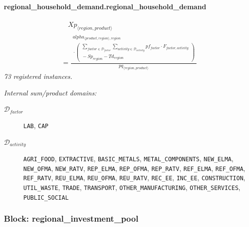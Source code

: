 \documentclass[11pt]{article}
\begin{document}
\paragraph{regional\_household\_demand.regional\_household\_demand}
\begin{align*}
&\quad Xp_{\langle region, product\rangle}\\
&= \frac{\begin{aligned}
alpha_{\langle product, region\rangle,region}\\
{}\cdot (\begin{aligned}
\sum_{factor \in \mathcal{D}_{factor}} \sum_{activity \in \mathcal{D}_{activity}} pf_{factor} \cdot F_{factor,activity}\\
{}- Sp_{region} - Td_{region}
\end{aligned})
\end{aligned}}{pq_{\langle region, product\rangle}}
\end{align*}
\noindent\emph{73 registered instances.}\par
\noindent\emph{Internal sum/product domains:}\par
\begin{description}
\item[\(\mathcal{D}_{factor}\)] \texttt{LAB}, \texttt{CAP}
\item[\(\mathcal{D}_{activity}\)] \texttt{AGRI\_FOOD}, \texttt{EXTRACTIVE}, \texttt{BASIC\_METALS}, \texttt{METAL\_COMPONENTS}, \texttt{NEW\_ELMA}, \texttt{NEW\_OFMA}, \texttt{NEW\_RATV}, \texttt{REP\_ELMA}, \texttt{REP\_OFMA}, \texttt{REP\_RATV}, \texttt{REF\_ELMA}, \texttt{REF\_OFMA}, \texttt{REF\_RATV}, \texttt{REU\_ELMA}, \texttt{REU\_OFMA}, \texttt{REU\_RATV}, \texttt{REC\_EE}, \texttt{INC\_EE}, \texttt{CONSTRUCTION}, \texttt{UTIL\_WASTE}, \texttt{TRADE}, \texttt{TRANSPORT}, \texttt{OTHER\_MANUFACTURING}, \texttt{OTHER\_SERVICES}, \texttt{PUBLIC\_SOCIAL}
\end{description}
\subsubsection*{Block: regional\_investment\_pool}
\end{document}
